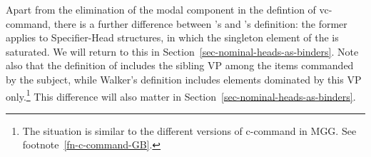 \documentclass[output=paper
 	        ,biblatex
                ,babelshorthands
                ,newtxmath
                ,draftmode
                ,colorlinks, citecolor=brown
]{langscibook}
\begin{document}

Apart from the elimination of the modal component in the defintion of vc-command, there is a further
difference between \citeauthor{HL95b}'s and \citeauthor{Walker2011a}'s definition: the former
applies to Specifier-Head structures, in which the singleton element of the \sprl is saturated. We
will return to this in Section~\ref{sec-nominal-heads-as-binders}. Note also that the definition of
\citeauthor{HL95b} includes the sibling VP among the items commanded by the subject, while Walker's
definition includes elements dominated by this VP only.\footnote{%
  The situation is similar to the different versions of c-command in MGG. See footnote~\ref{fn-c-command-GB}.
}
This difference will also matter in Section~\ref{sec-nominal-heads-as-binders}.
\end{document}
